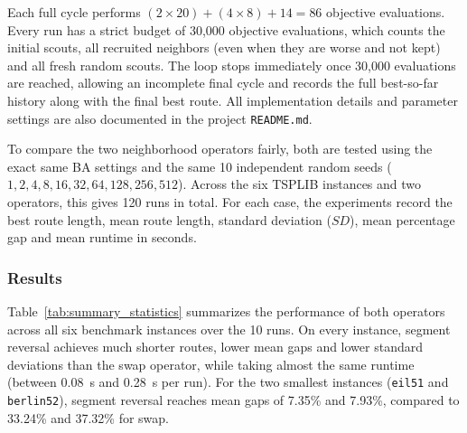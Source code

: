 Each full cycle performs \((2 \times 20) + (4 \times 8) + 14 = 86\) objective evaluations.
Every run has a strict budget of 30,000 objective evaluations, which counts the initial scouts, all recruited neighbors (even when they are worse and not kept) and all fresh random scouts.
The loop stops immediately once 30,000 evaluations are reached, allowing an incomplete final cycle and records the full best-so-far history along with the final best route.
All implementation details and parameter settings are also documented in the project \texttt{README.md}.

To compare the two neighborhood operators fairly, both are tested using the exact same BA settings and the same 10 independent random seeds (\(1, 2, 4, 8, 16, 32, 64, 128, 256, 512\)).
Across the six TSPLIB instances and two operators, this gives 120 runs in total.
For each case, the experiments record the best route length, mean route length, standard deviation (\(SD\)), mean percentage gap and mean runtime in seconds.

\subsubsection{Results}
Table~\ref{tab:summary_statistics} summarizes the performance of both operators across all six benchmark instances over the 10 runs.
On every instance, segment reversal achieves much shorter routes, lower mean gaps and lower standard deviations than the swap operator, while taking almost the same runtime (between 0.08~s and 0.28~s per run).
For the two smallest instances (\texttt{eil51} and \texttt{berlin52}), segment reversal reaches mean gaps of 7.35\% and 7.93\%, compared to 33.24\% and 37.32\% for swap.

